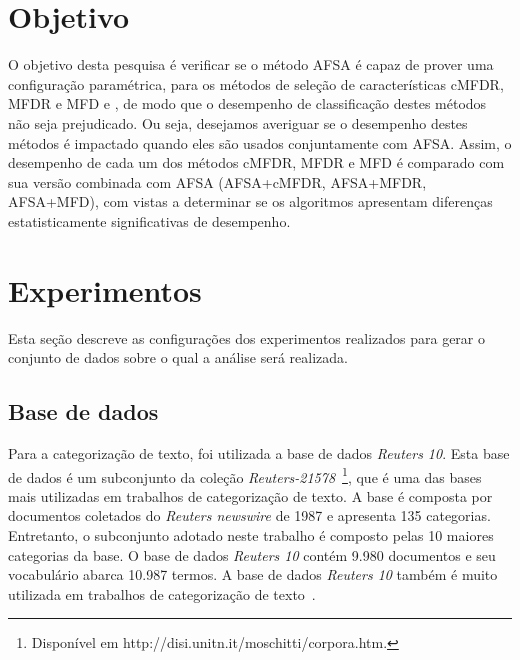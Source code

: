 \documentclass[conference]{IEEEtran}
\begin{document}
\section{Objetivo}
\label{sec:objetivo}

O objetivo desta pesquisa é verificar se o método AFSA é capaz de prover uma configuração paramétrica, para os métodos de seleção de características cMFDR, MFDR e MFD e , de modo que o desempenho de classificação destes métodos não seja prejudicado. Ou seja, desejamos averiguar se o desempenho destes métodos é impactado quando eles são usados conjuntamente com AFSA. Assim, o desempenho de cada um dos métodos cMFDR, MFDR e MFD é comparado com sua versão combinada com AFSA (AFSA+cMFDR, AFSA+MFDR, AFSA+MFD), com vistas a determinar se os algoritmos apresentam diferenças estatisticamente significativas de desempenho.


\section{Experimentos}
\label{sec:exp}

Esta seção descreve as configurações dos experimentos realizados para gerar o conjunto de dados sobre o qual a análise será realizada.

\subsection{Base de dados}
\label{sec:bd}

Para a categorização de texto, foi utilizada a base de dados \textit{Reuters 10}.
Esta base de dados é um subconjunto da coleção \textit{Reuters-21578}~\footnote{Disponível em http://disi.unitn.it/moschitti/corpora.htm.}, que é uma das bases mais utilizadas em trabalhos de categorização de texto.
A base é composta por documentos coletados do \textit{Reuters newswire} de 1987 e apresenta 135 categorias.
Entretanto, o subconjunto adotado neste trabalho é composto pelas 10 maiores categorias da base.
O base de dados \textit{Reuters 10} contém 9.980 documentos e seu vocabulário abarca 10.987 termos.
A base de dados \textit{Reuters 10} também é muito utilizada em trabalhos de categorização de texto~\cite{chang2008multilabel,chen2009feature,yang2011new}. 
\end{document}
